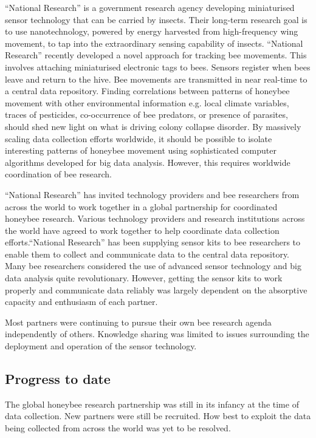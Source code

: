 \enquote{National Research} is a government research agency developing miniaturised sensor technology that can be carried by insects. Their long-term research goal is to use nanotechnology, powered by energy harvested from high-frequency wing movement, to tap into the extraordinary sensing capability of insects. \enquote{National Research} recently developed a novel approach for tracking bee movements. This involves attaching miniaturised electronic tags to bees. Sensors register when bees leave and return to the hive. Bee movements are transmitted in near real-time to a central data repository. Finding correlations between patterns of honeybee movement with other environmental information e.g. local climate variables, traces of pesticides, co-occurrence of bee predators, or presence of parasites, should shed new light on what is driving colony collapse disorder. By massively scaling data collection efforts worldwide, it should be possible to isolate interesting patterns of honeybee movement using sophisticated computer algorithms developed for big data analysis. However, this requires worldwide coordination of bee research. \medskip 

\enquote{National Research} has invited technology providers and bee researchers from across the world to work together in a global partnership for coordinated honeybee research. Various technology providers and research institutions across the world have agreed to work together to help coordinate data collection efforts.\enquote{National Research} has been supplying sensor kits to bee researchers to enable them to collect and communicate data to the central data repository. Many bee researchers considered the use of advanced sensor technology and big data analysis quite revolutionary. However, getting the sensor kits to work properly and communicate data reliably was largely dependent on the absorptive capacity and enthusiasm of each partner.\medskip

Most partners were continuing to pursue their own bee research agenda independently of others. Knowledge sharing was limited to issues surrounding the deployment and operation of the sensor technology. \medskip

\subsection{Progress to date}

The global honeybee research partnership was still in its infancy at the time of data collection. New partners were still be recruited. How best to exploit the data being collected from across the world was yet to be resolved. \medskip  

